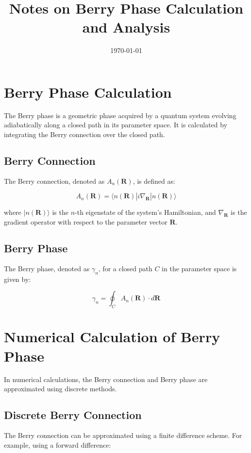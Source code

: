 \documentclass{article}
\title{Notes on Berry Phase Calculation and Analysis}
\date{\today}
\begin{document}
\maketitle

\section{Berry Phase Calculation}

The Berry phase is a geometric phase acquired by a quantum system evolving adiabatically along a closed path in its parameter space. It is calculated by integrating the Berry connection over the closed path.

\subsection{Berry Connection}

The Berry connection, denoted as $A_n(\mathbf{R})$, is defined as:

$$
A_n(\mathbf{R}) = \langle n(\mathbf{R}) | i \nabla_\mathbf{R} | n(\mathbf{R}) \rangle
$$

where $|n(\mathbf{R})\rangle$ is the $n$-th eigenstate of the system's Hamiltonian, and $\nabla_\mathbf{R}$ is the gradient operator with respect to the parameter vector $\mathbf{R}$.

\subsection{Berry Phase}

The Berry phase, denoted as $\gamma_n$, for a closed path $C$ in the parameter space is given by:

$$
\gamma_n = \oint_C A_n(\mathbf{R}) \cdot d\mathbf{R}
$$

\section{Numerical Calculation of Berry Phase}

In numerical calculations, the Berry connection and Berry phase are approximated using discrete methods.

\subsection{Discrete Berry Connection}

The Berry connection can be approximated using a finite difference scheme. For example, using a forward difference:
\end{document}
